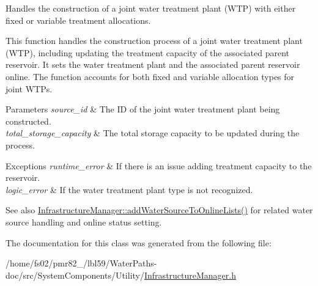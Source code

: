 Handles the construction of a joint water treatment plant (W\+TP) with either fixed or variable treatment allocations. 

This function handles the construction process of a joint water treatment plant (W\+TP), including updating the treatment capacity of the associated parent reservoir. It sets the water treatment plant and the associated parent reservoir online. The function accounts for both fixed and variable allocation types for joint W\+T\+Ps.


\begin{DoxyParams}{Parameters}
{\em source\+\_\+id} & The ID of the joint water treatment plant being constructed. \\
\hline
{\em total\+\_\+storage\+\_\+capacity} & The total storage capacity to be updated during the process.\\
\hline
\end{DoxyParams}

\begin{DoxyExceptions}{Exceptions}
{\em runtime\+\_\+error} & If there is an issue adding treatment capacity to the reservoir. \\
\hline
{\em logic\+\_\+error} & If the water treatment plant type is not recognized.\\
\hline
\end{DoxyExceptions}
\begin{DoxySeeAlso}{See also}
\mbox{\hyperlink{classInfrastructureManager_ab66bdc91a6f60c6aea6ce0bf179df913}{Infrastructure\+Manager\+::add\+Water\+Source\+To\+Online\+Lists()}} for related water source handling and online status setting. 
\end{DoxySeeAlso}


The documentation for this class was generated from the following file\+:\begin{DoxyCompactItemize}
\item 
/home/fs02/pmr82\+\_/lbl59/\+Water\+Paths-\/doc/src/\+System\+Components/\+Utility/\mbox{\hyperlink{InfrastructureManager_8h}{Infrastructure\+Manager.\+h}}\end{DoxyCompactItemize}
